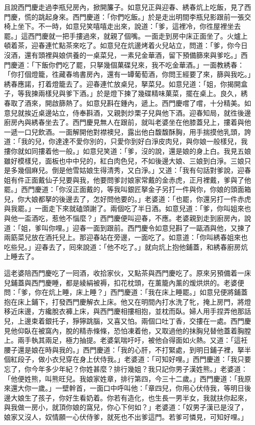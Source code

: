 且說西門慶走過李瓶兒房內，掀開簾子。如意兒正與迎春、綉春炕上吃飯，見了西門慶，慌的跳起身來。西門慶道：「你們吃飯。」於是走出明間李瓶兒影跟前一張交椅上坐下。不一時，如意兒笑嘻嘻走出來，說道：「爹，這裡冷，你徃屋裡坐去罷。」這西門慶就一把手摟過來，就親了個嘴。一面走到房中床正面坐了。火爐上頓着茶，迎春連忙點茶來吃了。如意兒在炕邊烤着火兒站立，問道：「爹，你今日沒酒，還有頭裡與娘供養的一桌菜兒，一素兒金華酒，留下預備篩來與爹吃。」西門慶道：「下飯你們吃了罷，只拏幾個菓碟兒來，我不吃金華酒。」一面教綉春：「你打個燈籠，徃藏春塢書房內，還有一罈葡萄酒，你問王經要了來，篩與我吃。」綉春應諾，打着燈籠去了。迎春連忙放桌兒，拏菜兒。如意兒道：「姐，你揭開盒子，等我揀兩樣兒與爹下酒。」於是燈下揀了幾碟精味菓菜，擺在桌上。良久，綉春取了酒來，開啟篩熱了。如意兒斟在鍾內，遞上。西門慶嚐了嚐，十分精美。如意兒就挨近桌邊站立，侍奉斟酒，又親剝炒栗子兒與他下酒。迎春知局，就徃後邊廚房內與綉春坐去了。西門慶見無人在跟前，就叫老婆坐在他膝蓋兒上，摟着與他一遞一口兒飲酒。{}一面解開他對襟襖兒，露出他白馥馥酥胸，用手揣摸他乳頭，誇道：「我的兒，你達達不愛你別的，只愛你到好白淨皮肉兒，與你娘一般樣兒，我摟你就如同摟着他一般。」如意兒笑道：「爹，沒的說，還是娘的身上白。我見五娘雖好模樣兒，面板也中中兒的，紅白肉色兒，不如後邊大娘、三娘到白淨。三娘只是多幾個麻兒。倒是他雪姑娘生得清秀，又白淨。」{}又道：「我有句話對爹說，迎春姐有件正面戴仙子兒要與我，他要問爹討娘家常戴的金赤虎，正月裡戴，爹與了他罷。」西門慶道：「你沒正面戴的，等我叫銀匠拏金子另打一件與你，你娘的頭面箱兒，你大娘都拏的後邊去了，怎好問他要的。」老婆道：「也罷，你還另打一件赤虎與我罷。」一面走下來就磕頭謝了。兩個吃了半日酒。如意兒道：「爹，你叫姐來也與他一盃酒吃，惹他不惱麼？」西門慶便叫迎春，不應。老婆親到走到廚房內，說道：「姐，爹叫你哩。」迎春一面到跟前。西門慶令如意兒斟了一甌酒與他，又揀了兩筯菜兒放在酒托兒上。那迎春站在旁邊，一面吃了。如意道：「你叫綉春姐來也吃些兒。」迎春去了，囘來說道：「他不吃了。」就向炕上抱他鋪蓋，和綉春廚房炕上睡去了。

這老婆陪西門慶吃了一囘酒，收拾家伙，又點茶與西門慶吃了。原來另預備着一床兒鋪蓋與西門慶睡，都是綾絹被褥，扣花枕頭，在薰籠內薰的煖烘烘的。老婆便問：「爹，你在炕上睡，床上睡？」西門慶道：「我在床上睡罷。」如意兒便將鋪蓋抱在床上鋪下，打發西門慶解衣上床。他又在明間內打水洗了牝，掩上房門，將燈移近床邊，方纔脫衣褲上床，與西門慶相摟相抱，並枕而臥。婦人用手捏弄他那話兒，上邊束着銀托子，猙獰跳腦，又喜又怕。兩個口吐丁香，交摟在一處。西門慶見他仰臥在被窩內，脫的精赤條條，恐怕凍着他，又取過他的抹胸兒替他蓋着胸膛上。兩手執其兩足，極力抽提。老婆氣喘吁吁，被他㒲得面如火熱。又道：「這衽腰子還是娘在時與我的。」西門慶道：「我的心肝，不打緊處，到明日鋪子裡，拏半個紅段子，做小衣兒穿在身上伏侍我。」老婆道：「可知好哩。」西門慶道：「我只要忘了，你今年多少年紀？你姓甚麼？排行幾姐？我只記你男子漢姓熊。」老婆道：「他便姓熊，叫熊旺兒。我娘家姓章，排行第四，今三十二歲。」西門慶道：「我原來還大你一歲。」一壁幹首，一面口中呼叫他：「章四兒，你用心伏侍我，等明日後邊大娘生了孩子，你好生看奶着。你若有造化，也生長一男半女，我就扶你起來，與我做一房小，就頂你娘的窩兒，你心下何如？」老婆道：「奴男子漢已是沒了，娘家又沒人，奴情願一心伏侍爹，就死也不出爹這門。若爹可憐見，可知好哩。」

